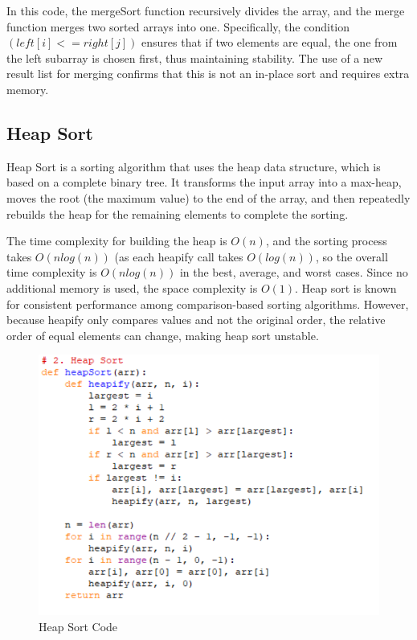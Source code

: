 \documentclass[sigconf]{acmart}
\begin{document}
In this code, the mergeSort function recursively divides the array, and the merge function merges two sorted arrays into one. Specifically, the condition $(left[i] <= right[j])$ ensures that if two elements are equal, the one from the left subarray is chosen first, thus maintaining stability. The use of a new result list for merging confirms that this is not an in-place sort and requires extra memory.
\subsection {Heap Sort}
Heap Sort is a sorting algorithm that uses the heap data structure, which is based on a complete binary tree. It transforms the input array into a max-heap, moves the root (the maximum value) to the end of the array, and then repeatedly rebuilds the heap for the remaining elements to complete the sorting.

The time complexity for building the heap is $O(n)$, and the sorting process takes $O(nlog(n))$ (as each heapify call takes $O(log(n))$, so the overall time complexity is $O(nlog(n))$ in the best, average, and worst cases. Since no additional memory is used, the space complexity is $O(1)$. Heap sort is known for consistent performance among comparison-based sorting algorithms.
However, because heapify only compares values and not the original order, the relative order of equal elements can change, making heap sort unstable.

\begin{figure}[t]
\centering
\includegraphics[width=0.85\linewidth]{figures/002.pdf}
\vspace{-0.3cm}
\caption{Heap Sort Code}  
\vspace{-0.35cm}
\label{fig:proportion}
\end{figure}
\end{document}
